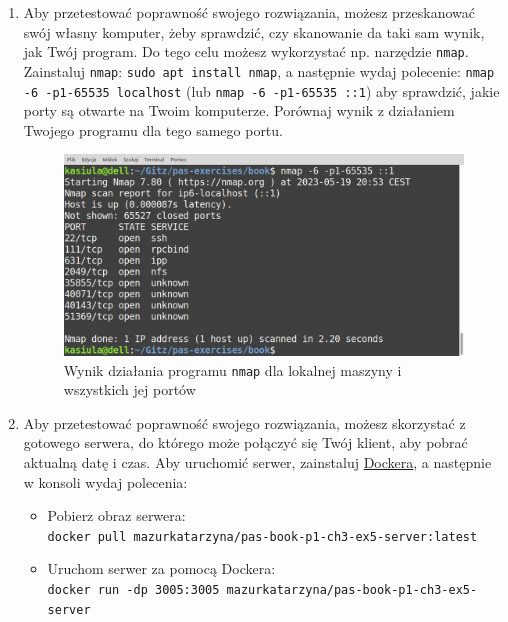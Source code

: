\begin{enumerate}[label=\textbf{3.\arabic*}]
\item Aby przetestować poprawność swojego rozwiązania, możesz przeskanować swój własny komputer, żeby sprawdzić, czy skanowanie da taki sam wynik, jak Twój program. Do tego celu możesz wykorzystać np. narzędzie \texttt{nmap}. Zainstaluj \texttt{nmap}: \texttt{sudo apt install nmap}, a następnie wydaj polecenie: \texttt{nmap -6 -p1-65535 localhost} (lub \texttt{nmap -6 -p1-65535 ::1}) aby sprawdzić, jakie porty są otwarte na Twoim komputerze. Porównaj wynik z działaniem Twojego programu dla tego samego portu.  

\begin{figure}[h]
\caption{Wynik działania programu \texttt{nmap} dla lokalnej maszyny i wszystkich jej portów}
\centering
\includegraphics[scale=0.35]{./images/answers/ex3.4-nmap.png}
\end{figure}   

\item Aby przetestować poprawność swojego rozwiązania, możesz skorzystać z gotowego serwera, do którego może połączyć się Twój klient, aby pobrać aktualną datę i czas. Aby uruchomić serwer, zainstaluj \href{https://www.docker.com/}{Dockera}, a następnie w konsoli wydaj polecenia:

\begin{itemize}
\item Pobierz obraz serwera:\\ \texttt{docker pull mazurkatarzyna/pas-book-p1-ch3-ex5-server:latest}

\item Uruchom serwer za pomocą Dockera:\\ \texttt{docker run -dp 3005:3005 mazurkatarzyna/pas-book-p1-ch3-ex5-server}
\end{itemize}


\end{enumerate}

